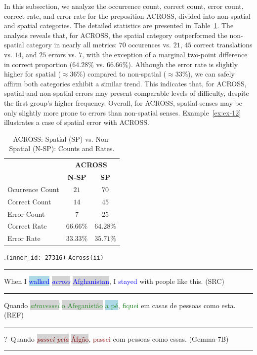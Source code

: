 In this subsection, we analyze the occurrence count, correct count, error count, correct rate, and error rate for the preposition ACROSS, divided into non-spatial and spatial categories. The detailed statistics are presented in Table~\ref{tab:across}. The analysis reveals that, for ACROSS, the spatial category outperformed the non-spatial category in nearly all metrics: $70$ occurences vs. $21$, $45$ correct translations vs. $14$, and $25$ errors vs. $7$, with the exception of a marginal two-point difference in correct proportion ($64.28\%$ vs. $66.66\%$). Although the error rate is slightly higher for spatial ($\approx36\%$) compared to non-spatial ($\approx33\%$), we can safely affirm both categories exhibit a similar trend. This indicates that, for ACROSS, spatial and non-spatial errors may present comparable levels of difficulty, despite the first group's higher frequency. Overall, for ACROSS, spatial senses may be only slightly more prone to errors than non-spatial senses. Example~\ref{ex:ex-12} illustrates a case of spatial error with ACROSS.


\begin{table}[htb]
\centering
\begin{tabular}{lcc}
\toprule
 & \multicolumn{2}{c}{\textbf{ACROSS}} \\ 
 & \textbf{N-SP} & \textbf{SP} \\ 
\midrule
Ocurrence Count & $21$ & $70$ \\ 
Correct Count & $14$ & $45$ \\ 
Error Count & $7$ & $25$ \\ 
\midrule
Correct Rate & $\mathbf{66.66\%}$ & $64.28\%$ \\ 
\midrule
Error Rate & $33.33\%$ & $\mathbf{35.71\%}$ \\ 
\bottomrule
\end{tabular}
\caption{ACROSS: Spatial (SP) vs. Non-Spatial (N-SP): Counts and Rates.}
\label{tab:across}
\end{table}


\ex.\texttt{(inner\_id: 27316)} \hfill \texttt{Across(ii)} \\[0.3ex]
\noindent\rule{\linewidth}{0.9pt}
When I \colorbox{lightblue}{\textcolor{blue}{walked}} \colorbox{lightgray}{\textcolor{blue}{\emph{across}}} \colorbox{lightgray}{\textcolor{blue}{Afghanistan}}, I \textcolor{blue}{stayed} with people like this. (SRC) \label{ex:ex-12} \\[-0.3ex]
\noindent\rule{\linewidth}{0.3pt}
Quando \colorbox{lightgray}{\textcolor{ForestGreen}{\emph{atravessei}}} \colorbox{lightgray}{\textcolor{ForestGreen}{o Afeganistão}} \colorbox{lightblue}{\textcolor{ForestGreen}{a pé}}, \textcolor{ForestGreen}{fiquei} em casas de pessoas como esta. (REF) \\[-0.3ex]
\noindent\rule{\linewidth}{0.3pt}
?~Quando \colorbox{lightgray}{\textcolor{Maroon}{\emph{passei pela}}} \colorbox{lightgray}{\textcolor{Maroon}{Áfgão}}, \textcolor{Maroon}{passei} com pessoas como essas. (Gemma-7B) \\[-0.3ex]
\noindent\rule{\linewidth}{0.9pt}

